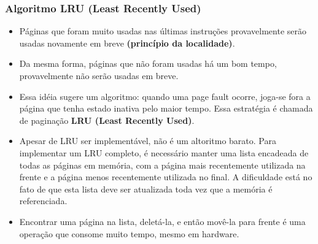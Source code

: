 \documentclass[10pt]{article}
\begin{document}
\subsubsection{Algoritmo LRU (Least Recently Used)}
\begin{itemize}
    \item Páginas que foram muito usadas nas últimas instruções provavelmente serão usadas
        novamente em breve \textbf{(princípio da localidade)}.
    \item Da mesma forma, páginas que não foram usadas há um bom tempo, provavelmente não
        serão usadas em breve. 
    \item Essa idéia sugere um algoritmo: quando uma page fault ocorre, joga-se fora a página
        que tenha estado inativa pelo maior tempo. Essa estratégia é chamada de paginação
        \textbf{LRU (Least Recently Used)}.
    \item Apesar de LRU ser implementável, não é um altoritmo barato. Para implementar um
        LRU completo, é necessário manter uma lista encadeada de todas as páginas em memória,
        com a página mais recentemente utilizada na frente e a página menos recentemente
        utilizada no final. A dificuldade está no fato de que esta lista deve ser atualizada
        toda vez que a memória é referenciada.
    \item Encontrar uma página na lista, deletá-la, e então movê-la para frente é uma operação
        que consome muito tempo, mesmo em hardware.
\end{itemize}
\end{document}
